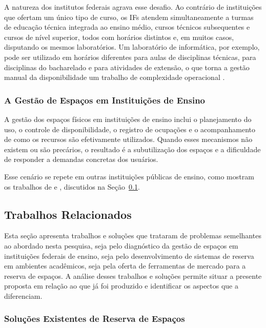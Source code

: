 \documentclass[
	12pt,				%
	twoside,			%
	openany,			%
	a4paper,			%
	chapter=TITLE,		%
	section=TITLE,		%
	subsection=TITLE,	%
	subsubsection=TITLE,%
	english,			%
	french,				%
	spanish,			%
	brazil,				%
	]{abntex2}
\begin{document}
A natureza dos institutos federais agrava esse desafio. Ao contrário de instituições que ofertam um único tipo de curso, os IFs atendem simultaneamente a turmas de educação técnica integrada ao ensino médio, cursos técnicos subsequentes e cursos de nível superior, todos com horários distintos e, em muitos casos, disputando os mesmos laboratórios. Um laboratório de informática, por exemplo, pode ser utilizado em horários diferentes para aulas de disciplinas técnicas, para disciplinas do bacharelado e para atividades de extensão, o que torna a gestão manual da disponibilidade um trabalho de complexidade operacional \cite{ifnmg2024pdi}.

\subsubsection{A Gestão de Espaços em Instituições de Ensino}
\label{sec:gestao}

A gestão dos espaços físicos em instituições de ensino inclui o planejamento do uso, o controle de disponibilidade, o registro de ocupações e o acompanhamento de como os recursos são efetivamente utilizados. Quando esses mecanismos não existem ou são precários, o resultado é a subutilização dos espaços e a dificuldade de responder a demandas concretas dos usuários.

Esse cenário se repete em outras instituições públicas de ensino, como mostram os trabalhos de  e , discutidos na Seção~\ref{sec:trabrel}.

\subsection{Trabalhos Relacionados}
\label{sec:trabrel}

Esta seção apresenta trabalhos e soluções que trataram de problemas semelhantes ao abordado nesta pesquisa, seja pelo diagnóstico da gestão de espaços em instituições federais de ensino, seja pelo desenvolvimento de sistemas de reserva em ambientes acadêmicos, seja pela oferta de ferramentas de mercado para a reserva de espaços. A análise desses trabalhos e soluções permite situar a presente proposta em relação ao que já foi produzido e identificar os aspectos que a diferenciam.

\subsubsection{Soluções Existentes de Reserva de Espaços}
\label{sec:relsoftwares}
\end{document}
